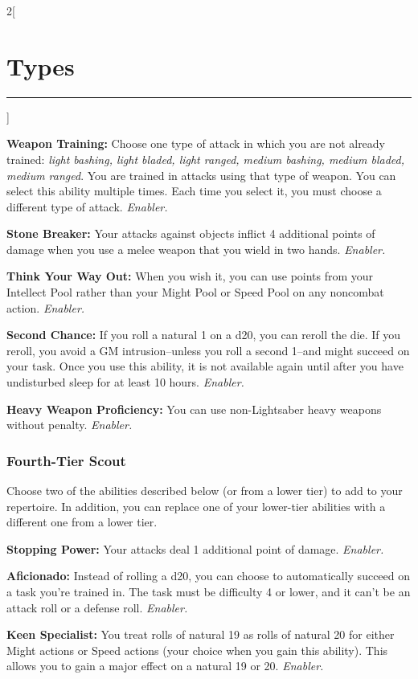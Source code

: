 \documentclass[a4paper,10pt,final]{book}
\newcommand{\HRule}{\rule{\linewidth}{0.5mm}} %
\newcommand{\newSection}[1]{\section*{#1} \addcontentsline{toc}{section}{#1} \label{sec:#1} \HRule}
\newcommand{\itemAbility}[2]{\textcolor{25gray}{\textbullet\textbf{ #1:}} {#2}\par}
\newcommand{\enabler}{\textit{ Enabler.}}
\newenvironment{docsection}[1]
{
  \begin{multicols*}{2}[\newSection{#1}]
}
{
  \end{multicols*}
  \newpage
}
\begin{document}
\begin{docsection}{Types}
\itemAbility{Weapon Training}{Choose one type of attack in which you are not already trained: \textit{light bashing, light bladed, light ranged, medium bashing, medium bladed, medium ranged}. You are trained in attacks using that type of weapon. You can select this ability multiple times. Each time you select it, you must choose a different type of attack.\enabler}

\itemAbility{Stone Breaker}{Your attacks against objects inflict 4 additional points of damage when you use a melee weapon that you wield in two hands.\enabler}

\itemAbility{Think Your Way Out}{When you wish it, you can use points from your Intellect Pool rather than your Might Pool or Speed Pool on any noncombat action.\enabler}

\itemAbility{Second Chance}{If you roll a natural 1 on a d20, you can reroll the die. If you reroll, you avoid a GM intrusion--unless you roll a second 1--and might succeed on your task. Once you use this ability, it is not available again until after you have undisturbed sleep for at least 10 hours.\enabler}

\itemAbility{Heavy Weapon Proficiency}{You can use non-Lightsaber heavy weapons without penalty.\enabler}


\subsubsection*{Fourth-Tier Scout}
\label{subsub:scoutFourthTier}

Choose two of the abilities described
below (or from a lower tier) to add to your
repertoire. In addition, you can replace one
of your lower-tier abilities with a different
one from a lower tier.

\itemAbility{Stopping Power}{Your attacks deal 1 additional point of damage.\enabler}

\itemAbility{Aficionado}{Instead of rolling a d20, you can choose to automatically succeed on a task you’re trained in. The task must be difficulty 4 or lower, and it can’t be an attack roll or a defense roll.\enabler}

\itemAbility{Keen Specialist}{You treat rolls of natural 19 as rolls of natural 20 for either Might actions or Speed actions (your choice when you gain this ability). This allows you to gain a major effect on a natural 19 or 20.\enabler}


\end{docsection}
\end{document}
